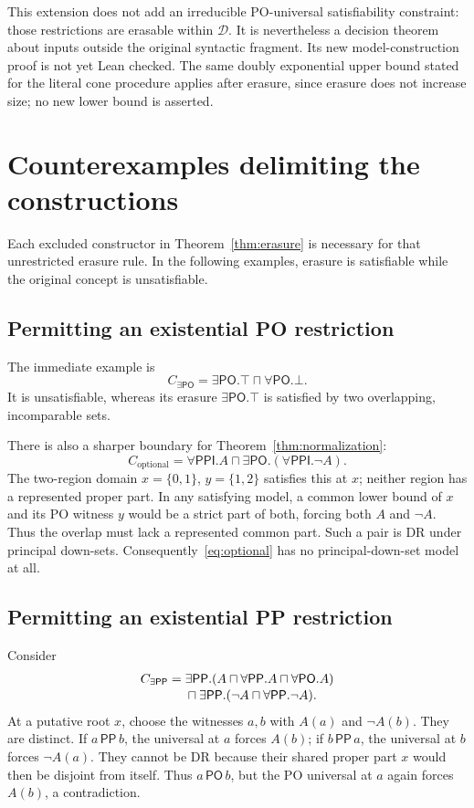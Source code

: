 \documentclass[11pt,letterpaper]{article}
\newcommand{\PP}{\mathsf{PP}}
\newcommand{\PPI}{\mathsf{PPI}}
\newcommand{\PO}{\mathsf{PO}}
\theoremstyle{definition}
\theoremstyle{remark}
\begin{document}
This extension does not add an irreducible PO-universal satisfiability
constraint: those restrictions are erasable within $\mathcal D$. It is
nevertheless a decision theorem about inputs outside the original
syntactic fragment. Its new model-construction proof is not yet Lean
checked. The same doubly exponential upper bound stated for the literal
cone procedure applies after erasure, since erasure does not increase size;
no new lower bound is asserted.

\section{Counterexamples delimiting the constructions}
\label{sec:boundaries}

Each excluded constructor in Theorem~\ref{thm:erasure} is necessary for
that unrestricted erasure rule. In the following examples, erasure is
satisfiable while the original concept is unsatisfiable.

\subsection{Permitting an existential PO restriction}

The immediate example is
\[
C_{\exists\PO}=\exists\PO.\top\sqcap\forall\PO.\bot.
\]
It is unsatisfiable, whereas its erasure $\exists\PO.\top$ is
satisfied by two overlapping, incomparable sets.

There is also a sharper boundary for Theorem~\ref{thm:normalization}:
\begin{equation}
C_{\mathrm{optional}}=
\forall\PPI.A\sqcap\exists\PO.(\forall\PPI.\neg A).
\label{eq:optional}
\end{equation}
The two-region domain $x=\{0,1\}$, $y=\{1,2\}$ satisfies this at $x$;
neither region has a represented proper part. In any satisfying model,
a common lower bound of $x$ and its PO witness $y$ would be a strict
part of both, forcing both $A$ and $\neg A$. Thus the overlap must
lack a represented common part. Such a pair is DR under principal
down-sets. Consequently~\eqref{eq:optional} has no principal-down-set
model at all.

\subsection{Permitting an existential PP restriction}

Consider
\begin{align}
C_{\exists\PP}={}&
\exists\PP.(A\sqcap\forall\PP.A\sqcap\forall\PO.A)
\notag\\[-2pt]
&\sqcap\exists\PP.(\neg A\sqcap\forall\PP.\neg A).
\label{eq:ppboundary}
\end{align}
At a putative root $x$, choose the witnesses $a,b$ with $A(a)$ and
$\neg A(b)$. They are distinct. If $a\,\PP\,b$, the universal at
$a$ forces $A(b)$; if $b\,\PP\,a$, the universal at $b$ forces
$\neg A(a)$. They cannot be DR because their shared proper part $x$
would then be disjoint from itself. Thus $a\,\PO\,b$, but the PO
universal at $a$ again forces $A(b)$, a contradiction.
\end{document}
